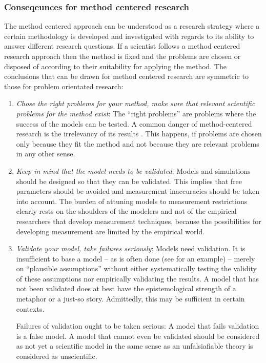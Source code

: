 \documentclass[onecollarge]{STJour}
\numberwithin{equation}{section}
\begin{document}
\subsubsection{Conseqeunces for method centered research}

The method centered approach can be understood as a research strategy
where a certain methodology is developed and investigated with regards
to its ability to answer different research questions. If a scientist
follows a method centered research approach then the method is fixed
and the problems are chosen or disposed of according to their
suitability for applying the method. The conclusions that can be drawn
for method centered research are symmetric to those for problem
orientated research:

\begin{enumerate}
  
  \item {\em Chose the right problems for your method, make sure that
  relevant scientific problems for the method exist}: The
  ``right problems'' are problems where the success of the 
  models can be tested. A common danger of method-centered research is
  the irrelevancy of its results \citep{shapiro:2005}. This happens, if
  problems are chosen only because they fit the method and not because
  they are relevant problems in any other sense.

  \item {\em Keep in mind that the model needs to be validated}: Models
  and simulations should be designed so that they can be validated. This
  implies that free parameters should be avoided and measurement
  inaccuracies should be taken into account. The burden of attuning
  models to measurement restrictions clearly rests on the shoulders of
  the modelers and not of the empirical researchers that develop
  measurement techniques, because the possibilities for
  developing measurement are limited by the empirical world.
  
  \item {\em Validate your model, take failures seriously}: Models need
  validation. It is insufficient to base a model -- as is often done (see
  \citet{hegselmann-krause:2002} for an example) -- merely on ``plausible
  assumptions'' without either systematically testing the validity of
  these assumptions nor empirically validating the results. A model that
  has not been validated does at best have the epistemological strength
  of a metaphor or a just-so story. Admittedly, this may be
  sufficient in certain contexts.
  
  Failures of validation ought to be taken serious: A model that fails
  validation is a false model. A model that cannot even be validated
  should be considered as not yet a scientific model in the same sense as
  an unfalsiafiable theory is considered as unscientific.

\end{enumerate}
\end{document}
